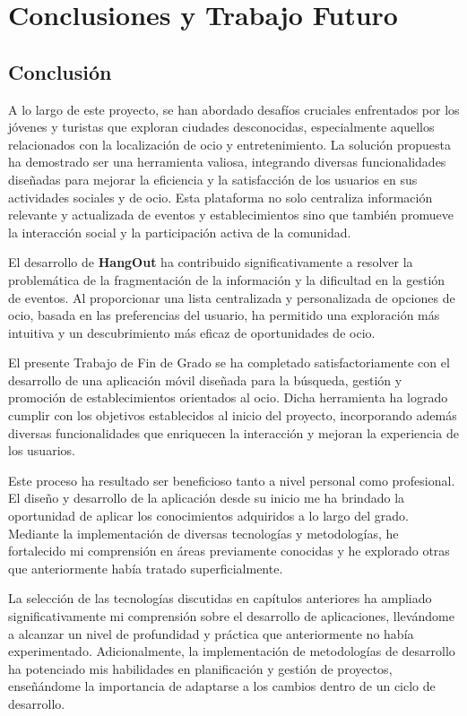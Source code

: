 \chapter{Conclusiones y Trabajo Futuro}

\section{Conclusión}

A lo largo de este proyecto, se han abordado desafíos cruciales enfrentados por los jóvenes y turistas que exploran ciudades desconocidas, especialmente aquellos relacionados con la localización de ocio y entretenimiento. La solución propuesta ha demostrado ser una herramienta valiosa, integrando diversas funcionalidades diseñadas para mejorar la eficiencia y la satisfacción de los usuarios en sus actividades sociales y de ocio. Esta plataforma no solo centraliza información relevante y actualizada de eventos y establecimientos sino que también promueve la interacción social y la participación activa de la comunidad.

El desarrollo de \textbf{HangOut} ha contribuido significativamente a resolver la problemática de la fragmentación de la información y la dificultad en la gestión de eventos. Al proporcionar una lista centralizada y personalizada de opciones de ocio, basada en las preferencias del usuario, ha permitido una exploración más intuitiva y un descubrimiento más eficaz de oportunidades de ocio.

El presente Trabajo de Fin de Grado se ha completado satisfactoriamente con el desarrollo de una aplicación móvil diseñada para la búsqueda, gestión y promoción de establecimientos orientados al ocio. Dicha herramienta ha logrado cumplir con los objetivos establecidos al inicio del proyecto, incorporando además diversas funcionalidades que enriquecen la interacción y mejoran la experiencia de los usuarios.

Este proceso ha resultado ser beneficioso tanto a nivel personal como profesional. El diseño y desarrollo de la aplicación desde su inicio me ha brindado la oportunidad de aplicar los conocimientos adquiridos a lo largo del grado. Mediante la implementación de diversas tecnologías y metodologías, he fortalecido mi comprensión en áreas previamente conocidas y he explorado otras que anteriormente había tratado superficialmente.

La selección de las tecnologías discutidas en capítulos anteriores ha ampliado significativamente mi comprensión sobre el desarrollo de aplicaciones, llevándome a alcanzar un nivel de profundidad y práctica que anteriormente no había experimentado. Adicionalmente, la implementación de metodologías de desarrollo ha potenciado mis habilidades en planificación y gestión de proyectos, enseñándome la importancia de adaptarse a los cambios dentro de un ciclo de desarrollo.

